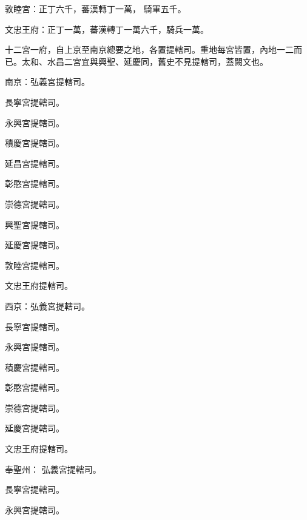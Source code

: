 \begin{pinyinscope}
 敦睦宮：正丁六千，蕃漢轉丁一萬，
 騎軍五千。



 文忠王府：正丁一萬，蕃漢轉丁一萬六千，騎兵一萬。



 十二宮一府，自上京至南京總要之地，各置提轄司。重地每宮皆置，內地一二而已。太和、水昌二宮宜與興聖、延慶同，舊史不見提轄司，蓋闕文也。



 南京：弘義宮提轄司。



 長寧宮提轄司。



 永興宮提轄司。



 積慶宮提轄司。



 延昌宮提轄司。



 彰愍宮提轄司。



 崇德宮提轄司。



 興聖宮提轄司。



 延慶宮提轄司。



 敦睦宮提轄司。



 文忠王府提轄司。



 西京：弘義宮提轄司。



 長寧宮提轄司。



 永興宮提轄司。



 積慶宮提轄司。



 彰愍宮提轄司。



 崇德宮提轄司。



 延慶宮提轄司。



 文忠王府提轄司。



 奉聖州：
 弘義宮提轄司。



 長寧宮提轄司。



 永興宮提轄司。




\end{pinyinscope}
